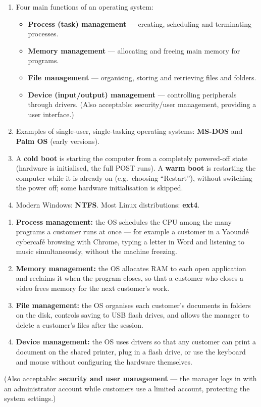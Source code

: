 \documentclass[11pt]{article}
\begin{document}
\begin{corrige}
\begin{enumerate}
\item Four main functions of an operating system:
\begin{itemize}
\item \textbf{Process (task) management} — creating, scheduling and terminating processes.
\item \textbf{Memory management} — allocating and freeing main memory for programs.
\item \textbf{File management} — organising, storing and retrieving files and folders.
\item \textbf{Device (input/output) management} — controlling peripherals through drivers. (Also acceptable: security/user management, providing a user interface.)
\end{itemize}
\item Examples of single-user, single-tasking operating systems: \textbf{MS-DOS} and \textbf{Palm OS} (early versions).
\item A \textbf{cold boot} is starting the computer from a completely powered-off state (hardware is initialised, the full POST runs). A \textbf{warm boot} is restarting the computer while it is already on (e.g.\ choosing ``Restart''), without switching the power off; some hardware initialisation is skipped.
\item Modern Windows: \textbf{NTFS}. Most Linux distributions: \textbf{ext4}.
\end{enumerate}
\end{corrige}

\begin{corrige}
\begin{enumerate}
\item \textbf{Process management:} the OS schedules the CPU among the many programs a customer runs at once — for example a customer in a Yaoundé cybercafé browsing with Chrome, typing a letter in Word and listening to music simultaneously, without the machine freezing.
\item \textbf{Memory management:} the OS allocates RAM to each open application and reclaims it when the program closes, so that a customer who closes a video frees memory for the next customer's work.
\item \textbf{File management:} the OS organises each customer's documents in folders on the disk, controls saving to USB flash drives, and allows the manager to delete a customer's files after the session.
\item \textbf{Device management:} the OS uses drivers so that any customer can print a document on the shared printer, plug in a flash drive, or use the keyboard and mouse without configuring the hardware themselves.
\end{enumerate}
(Also acceptable: \textbf{security and user management} — the manager logs in with an administrator account while customers use a limited account, protecting the system settings.)
\end{corrige}
\end{document}
